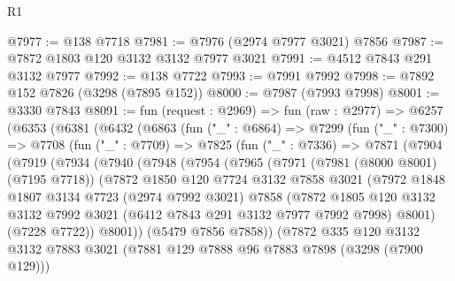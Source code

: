 \begin{lexlean}{R1}
\begin{coremodule}
@7977 := @138 @7718
@7981 := @7976 (@2974 @7977 @3021) @7856
@7987 := @7872 @1803 @120 @3132 @3132 @7977 @3021
@7991 := @4512 @7843 @291 @3132 @7977
@7992 := @138 @7722
@7993 := @7991 @7992
@7998 := @7892 @152 @7826 (@3298 (@7895 @152))
@8000 := @7987 (@7993 @7998)
@8001 := @3330 @7843
@8091 := fun (request : @2969) =>
  fun (raw : @2977) =>
  @6257
    (@6353
      (@6381
        (@6432
          (@6863
            (fun ("_" : @6864) =>
            @7299
              (fun ("_" : @7300) =>
              @7708
                (fun ("_" : @7709) =>
                @7825
                  (fun ("_" : @7336) =>
                  @7871
                    (@7904
                      (@7919
                        (@7934
                          (@7940
                            (@7948
                              (@7954
                                (@7965
                                  (@7971
                                    (@7981 (@8000 @8001) (@7195 @7718))
                                    (@7872
                                      @1850
                                      @120
                                      @7724
                                      @3132
                                      @7858
                                      @3021
                                      (@7972
                                        @1848
                                        @1807
                                        @3134
                                        @7723
                                        (@2974 @7992 @3021)
                                        @7858
                                        (@7872
                                          @1805
                                          @120
                                          @3132
                                          @3132
                                          @7992
                                          @3021
                                          (@6412 @7843 @291 @3132 @7977 @7992 @7998)
                                          @8001)
                                        (@7228 @7722))
                                      @8001))
                                  (@5479 @7856 @7858))
                                (@7872
                                  @335
                                  @120
                                  @3132
                                  @3132
                                  @7883
                                  @3021
                                  (@7881 @129 @7888 @96 @7883 @7898 (@3298 (@7900 @129)))

\end{coremodule}
\end{lexlean}
